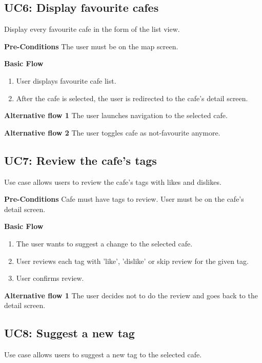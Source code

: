 
\subsection{UC6: Display favourite cafes}
Display every favourite cafe in the form of the list view. 

\textbf{Pre-Conditions} The user must be on the map screen.

\newpara
\textbf{Basic Flow}

\begin{enumerate}
    \item User displays favourite cafe list.
    \item After the cafe is selected, the user is redirected to the cafe's detail screen.
\end{enumerate}

\textbf{Alternative flow 1} The user launches navigation to the selected cafe.

\textbf{Alternative flow 2} The user toggles cafe as not-favourite anymore.


\subsection{UC7: Review the cafe's tags}
Use case allows users to review the cafe's tags with likes and dislikes. 

\textbf{Pre-Conditions} Cafe must have tags to review.  User must be on the cafe's detail screen.

\newpara
\textbf{Basic Flow}

\begin{enumerate}
    \item The user wants to suggest a change to the selected cafe.
    \item User reviews each tag with 'like', 'dislike' or skip review for the given tag. 
    \item User confirms review.
\end{enumerate}

\textbf{Alternative flow 1} The user decides not to do the review and goes back to the detail screen.


\subsection{UC8:  Suggest a new tag}
Use case allows users to suggest a new tag to the selected cafe.


